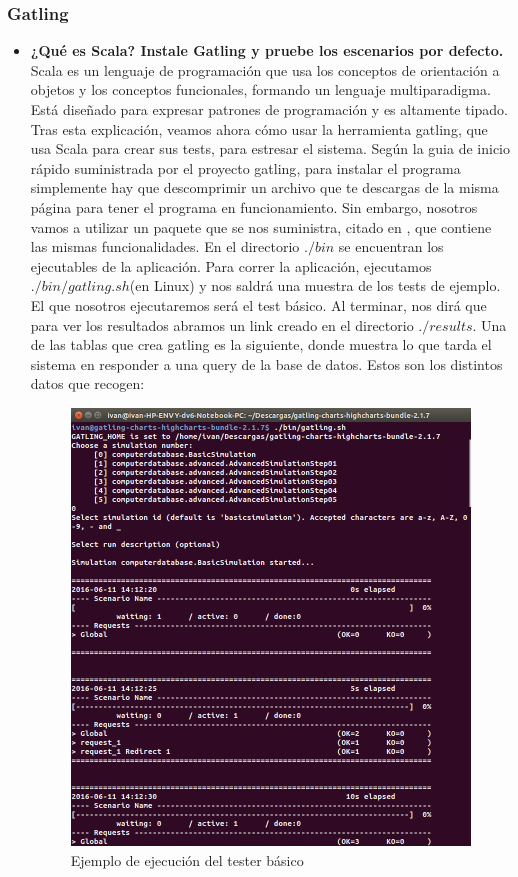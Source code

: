\subsubsection{Gatling}
\begin{itemize}
	\item \textbf{¿Qué es Scala? Instale Gatling y pruebe los escenarios por defecto.}\\
	Scala \cite{scala} es un lenguaje de programación que usa los conceptos de orientación a objetos y los conceptos funcionales, formando un lenguaje multiparadigma. Está diseñado para expresar patrones de programación y es altamente tipado.\\
	
	Tras esta explicación, veamos ahora cómo usar la herramienta gatling, que usa Scala para crear sus tests, para estresar el sistema. Según la guia de inicio rápido suministrada por el proyecto gatling\cite{gatling}, para instalar el programa simplemente hay que descomprimir un archivo que te descargas de la misma página para tener el programa en funcionamiento. Sin embargo, nosotros vamos a utilizar un paquete que se nos suministra, citado en \cite{gatling2}, que contiene las mismas funcionalidades. En el directorio $./bin$ se encuentran los ejecutables de la aplicación. Para correr la aplicación, ejecutamos $./bin/gatling.sh$(en Linux) y nos saldrá una muestra de los tests de ejemplo. El que nosotros ejecutaremos será el test básico. Al terminar, nos dirá que para ver los resultados abramos un link creado en el directorio $./results$. Una de las tablas que crea gatling es la siguiente, donde muestra lo que tarda el sistema en responder a una query de la base de datos. Estos son los distintos datos que recogen:\\
	
	\begin{figure}[H]
		\centering
		\includegraphics[width=0.7\linewidth]{Ejemplo_Ejecucion}
		\caption[Ejemplo ejecución]{Ejemplo de ejecución del tester básico}
		\label{fig:Ejemplo_Ejecucion}
	\end{figure}
	

\end{itemize}
